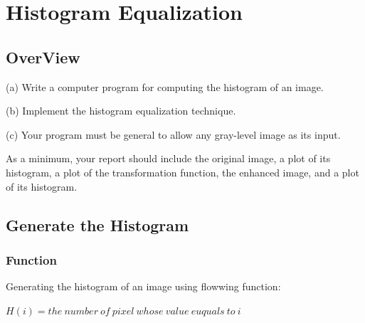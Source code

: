 \documentclass[11pt,oneside]{book}
\begin{document}


\tableofcontents

\chapter{Histogram Equalization}

\section{OverView}
(a) Write a computer program for computing the histogram of an image.

(b) Implement the histogram equalization technique.

(c) Your program must be general to allow any gray-level image as its input.

As a minimum, your report should include the original image, a plot of its histogram, a plot of the transformation function, the enhanced image, and a plot of its histogram.
\section{Generate the Histogram}
\subsection{Function}
Generating the histogram of an image using flowwing function:\\
\begin{center}
$H(i) = the\ number\ of\ pixel\ whose\ value\ euquals\ to\ i$
\end{center}
\end{document}
